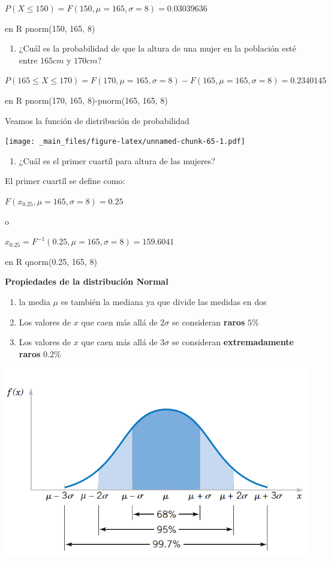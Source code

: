 \documentclass[
]{book}
\providecommand{\tightlist}{%
  \setlength{\itemsep}{0pt}\setlength{\parskip}{0pt}}
\begin{document}
\(P(X\le 150)=F(150, \mu=165, \sigma=8)=0.03039636\)

en R pnorm(150, 165, 8)

\begin{enumerate}
\def\labelenumi{\arabic{enumi})}
\setcounter{enumi}{1}
\tightlist
\item
  ¿Cuál es la probabilidad de que la altura de una mujer en la población esté entre \(165cm\) y \(170cm\)?
\end{enumerate}

\(P(165 \le X \le 170)=F(170, \mu=165, \sigma=8)-F(165, \mu=165, \sigma=8)=0.2340145\)

en R pnorm(170, 165, 8)-pnorm(165, 165, 8)

Veamos la función de distribución de probabilidad

\texttt{[image: \_main\_files/figure-latex/unnamed-chunk-65-1.pdf]}

\begin{enumerate}
\def\labelenumi{\arabic{enumi})}
\setcounter{enumi}{2}
\tightlist
\item
  ¿Cuál es el primer cuartíl para altura de las mujeres?
\end{enumerate}

El primer cuartíl se define como:

\(F(x_{0.25}, \mu=165, \sigma=8)=0.25\)

o

\(x_{0.25}=F^{-1}(0.25, \mu=165, \sigma=8)=159.6041\)

en R qnorm(0.25, 165, 8)

\textbf{Propiedades de la distribución Normal}

\begin{enumerate}
\def\labelenumi{\arabic{enumi})}
\item
  la media \(\mu\) es también la mediana ya que divide las medidas en dos
\item
  Los valores de \(x\) que caen más allá de 2\(\sigma\) se consideran \textbf{raros} \(5\%\)
\item
  Los valores de \(x\) que caen más allá de 3\(\sigma\) se consideran \textbf{extremadamente raros} \(0.2\%\)
\end{enumerate}

\includegraphics{./figures/probs.png}
\end{document}
